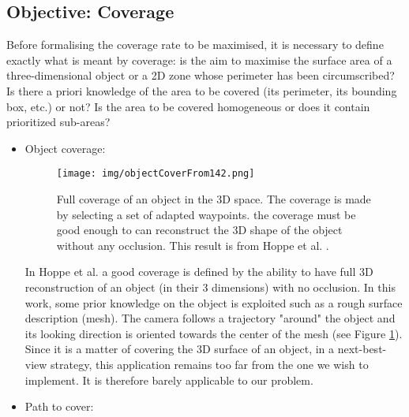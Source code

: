 \subsection{Objective: Coverage }\label{sec:FirstObjCover}

Before formalising the coverage rate to be maximised, it is necessary to define exactly what is meant by coverage: is the aim to maximise the surface area of a three-dimensional object or a 2D zone whose perimeter has been circumscribed? Is there a priori knowledge of the area to be covered (its perimeter, its bounding box, etc.) or not? Is the area to be covered homogeneous or does it contain prioritized sub-areas? 


\begin{itemize}
\item Object coverage: \\
\begin{figure}[t!]
\center
{}
   \texttt{[image: img/objectCoverFrom142.png]}
  \caption{Full coverage of an object in the 3D space. The coverage is made by selecting a set of adapted waypoints. the coverage must be good enough to can reconstruct the 3D shape of the object without any occlusion. This result is from Hoppe et al. \cite{142*hoppe2012}.}\label{fig:ObjectCover142}
  \endminipage\hfill
\end{figure}
   In Hoppe et al. \cite{142*hoppe2012} a good coverage is defined by the ability to have full 3D reconstruction of an object (in their 3 dimensions) with no occlusion. In this work, some prior knowledge on the object is exploited such as a rough surface description (mesh). The camera follows a trajectory "around" the object and its looking direction is oriented towards the center of the mesh (see Figure \ref{fig:ObjectCover142}). 
  Since it is a matter of covering the 3D surface of an object, in a next-best-view strategy, this application remains too far from the one we wish to implement.  It is therefore barely applicable to our problem. \\ 
   \item Path to cover: \\
   \begin{figure}[t!]
\center
{}

\end{figure}
\end{itemize}
